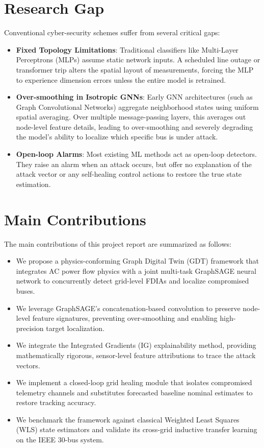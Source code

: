 \documentclass[12pt,a4paper]{report}
\begin{document}
\section{Research Gap}
Conventional cyber-security schemes suffer from several critical gaps:
\begin{itemize}
    \item \textbf{Fixed Topology Limitations}: Traditional classifiers like Multi-Layer Perceptrons (MLPs) assume static network inputs. A scheduled line outage or transformer trip alters the spatial layout of measurements, forcing the MLP to experience dimension errors unless the entire model is retrained.
    \item \textbf{Over-smoothing in Isotropic GNNs}: Early GNN architectures (such as Graph Convolutional Networks) aggregate neighborhood states using uniform spatial averaging. Over multiple message-passing layers, this averages out node-level feature details, leading to over-smoothing and severely degrading the model's ability to localize which specific bus is under attack.
    \item \textbf{Open-loop Alarms}: Most existing ML methods act as open-loop detectors. They raise an alarm when an attack occurs, but offer no explanation of the attack vector or any self-healing control actions to restore the true state estimation.
\end{itemize}

\section{Main Contributions}
The main contributions of this project report are summarized as follows:
\begin{itemize}
    \item We propose a physics-conforming Graph Digital Twin (GDT) framework that integrates AC power flow physics with a joint multi-task GraphSAGE neural network to concurrently detect grid-level FDIAs and localize compromised buses.
    \item We leverage GraphSAGE's concatenation-based convolution to preserve node-level feature signatures, preventing over-smoothing and enabling high-precision target localization.
    \item We integrate the Integrated Gradients (IG) explainability method, providing mathematically rigorous, sensor-level feature attributions to trace the attack vectors.
    \item We implement a closed-loop grid healing module that isolates compromised telemetry channels and substitutes forecasted baseline nominal estimates to restore tracking accuracy.
    \item We benchmark the framework against classical Weighted Least Squares (WLS) state estimators and validate its cross-grid inductive transfer learning on the IEEE 30-bus system.
\end{itemize}
\end{document}

